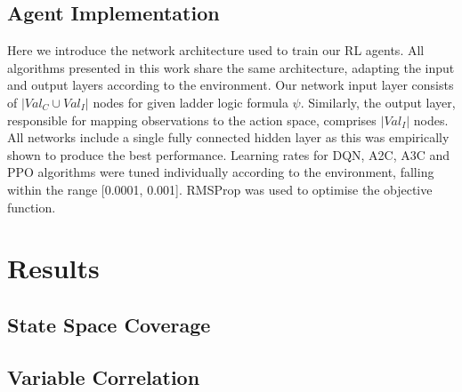 \documentclass[runningheads]{llncs}
\begin{document}
\subsection{Agent Implementation}
Here we introduce the network architecture used to train our RL agents. All algorithms presented in this work share the same architecture, adapting the input and output layers according to the environment. Our network input layer consists of $|Val_C \cup Val_I|$ nodes for given ladder logic formula $\psi$. Similarly, the output layer, responsible for mapping observations to the action space, comprises $|Val_I|$ nodes. All networks include a single fully connected hidden layer as this was empirically shown to produce the best performance. Learning rates for DQN, A2C, A3C and PPO algorithms were tuned individually according to the environment, falling within the range [0.0001, 0.001]. RMSProp was used to optimise the objective function.

\section{Results}\label{sec:results}
\subsection{State Space Coverage}
\subsection{Variable Correlation}
\end{document}
